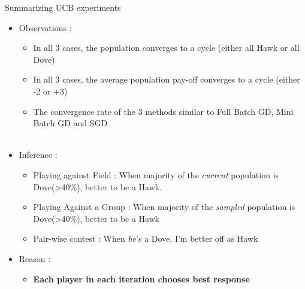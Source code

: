 \documentclass{IFES-beamer}
\begin{document}
        
        \begin{frame}{Summarizing UCB experiments}
            \begin{itemize}
                \item Observations :
                    \begin{itemize}
                        \item In all 3 cases, the population converges to a cycle (either all Hawk or all Dove)
                        \item In all 3 cases, the average population pay-off converges to a cycle (either -2 or +3)
                        \item The convergence rate of the 3 methods similar to Full Batch GD, Mini Batch GD and SGD\\\\
                    \end{itemize}
                \item Inference :
                    \begin{itemize}
                        \item Playing against Field : When majority of the \emph{current} population is Dove(>40$\%$), better to be a Hawk.
                        \item Playing Against a Group : When majority of the \emph{sampled} population is Dove(>40$\%$), better to be a Hawk
                        \item Pair-wise contest : When \emph{he}'s a Dove, I'm better off as Hawk
                    \end{itemize}
                \item Reason :
                    \begin{itemize}
                        \item \textbf{Each player in each iteration chooses best response}
                    \end{itemize}
            \end{itemize}
        \end{frame}
        
\end{document}

